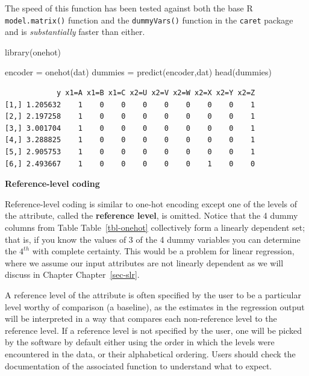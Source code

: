 \documentclass[
  letterpaper,
  DIV=11,
  numbers=noendperiod]{scrreprt}
\newenvironment{Shaded}{\begin{snugshade}}{\end{snugshade}}
\newcommand{\FunctionTok}[1]{\textcolor[rgb]{0.28,0.35,0.67}{#1}}
\newcommand{\NormalTok}[1]{\textcolor[rgb]{0.00,0.23,0.31}{#1}}
\newcommand{\OtherTok}[1]{\textcolor[rgb]{0.00,0.23,0.31}{#1}}
\begin{document}
The speed of this function has been tested against both the base R
\texttt{model.matrix()} function and the \texttt{dummyVars()} function
in the \texttt{caret} package and is \emph{substantially} faster than
either.

\begin{Shaded}
\begin{Highlighting}[]
\FunctionTok{library}\NormalTok{(onehot)}

\NormalTok{encoder  }\OtherTok{=} \FunctionTok{onehot}\NormalTok{(dat)}
\NormalTok{dummies }\OtherTok{=} \FunctionTok{predict}\NormalTok{(encoder,dat)}
\FunctionTok{head}\NormalTok{(dummies)}
\end{Highlighting}
\end{Shaded}

\begin{verbatim}
            y x1=A x1=B x1=C x2=U x2=V x2=W x2=X x2=Y x2=Z
[1,] 1.205632    1    0    0    0    0    0    0    0    1
[2,] 2.197258    1    0    0    0    0    0    0    0    1
[3,] 3.001704    1    0    0    0    0    0    0    0    1
[4,] 3.288825    1    0    0    0    0    0    0    0    1
[5,] 2.905753    1    0    0    0    0    0    0    0    1
[6,] 2.493667    1    0    0    0    0    0    1    0    0
\end{verbatim}

\textbf{Reference-level coding}

Reference-level coding is similar to one-hot encoding except one of the
levels of the attribute, called the \textbf{reference level}, is
omitted. Notice that the 4 dummy columns from Table
Table~\ref{tbl-onehot} collectively form a linearly dependent set; that
is, if you know the values of 3 of the 4 dummy variables you can
determine the \(4^{th}\) with complete certainty. This would be a
problem for linear regression, where we assume our input attributes are
not linearly dependent as we will discuss in Chapter
Chapter~\ref{sec-slr}.

A reference level of the attribute is often specified by the user to be
a particular level worthy of comparison (a baseline), as the estimates
in the regression output will be interpreted in a way that compares each
non-reference level to the reference level. If a reference level is not
specified by the user, one will be picked by the software by default
either using the order in which the levels were encountered in the data,
or their alphabetical ordering. Users should check the documentation of
the associated function to understand what to expect.
\end{document}
